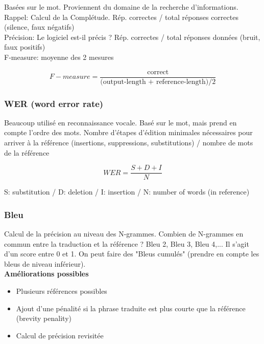 Basées sur le mot.
Proviennent du domaine de la recherche d'informations. \\

Rappel: Calcul de la Complétude. Rép. correctes / total réponses correctes (silence, faux négatifs) \\

Précision: Le logiciel est-il précis ? Rép. correctes / total réponses données (bruit, faux positifs) \\

F-measure: moyenne des 2 mesures

$$F-measure = \frac{\text{correct}}{\text{(output-length + reference-length)}/2}$$

\subsubsection{WER (word error rate)}

Beaucoup utilisé en reconnaissance vocale. Basé sur le mot, mais prend en compte l'ordre des mots. Nombre d'étapes d'édition minimales nécessaires pour arriver à la référence (insertions, suppressions, substitutions) / nombre de mots de la référence

$$WER = \frac{S+D+I}{N}$$

\vspace{0.5cm}

S: substitution /
D: deletion /
I: insertion /
N: number of words (in reference)

\subsubsection{Bleu}

Calcul de la précision au niveau des N-grammes. Combien de N-grammes en commun entre la traduction et la référence ?
Bleu 2, Bleu 3, Bleu 4,... Il s'agit d'un score entre 0 et 1. On peut faire des "Bleus cumulés" (prendre en compte les bleus de niveau inférieur).\\

\textbf{Améliorations possibles}

\begin{itemize}
    \item Plusieurs références possibles
    \item Ajout d'une pénalité si la phrase traduite est plus courte que la référence (brevity penality)
    \item Calcul de précision revisitée\\
\end{itemize}

